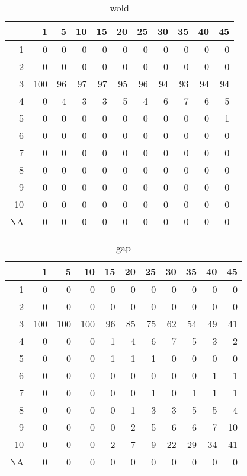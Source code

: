 \documentclass[11pt]{article}
\begin{document}
\begin{table}[H]
\centering
\begin{tabular}{rrrrrrrrrrr}
  \hline
 & 1 & 5 & 10 & 15 & 20 & 25 & 30 & 35 & 40 & 45 \\ 
  \hline
1 & 0 & 0 & 0 & 0 & 0 & 0 & 0 & 0 & 0 & 0 \\ 
  2 & 0 & 0 & 0 & 0 & 0 & 0 & 0 & 0 & 0 & 0 \\ 
  3 & 100 & 96 & 97 & 97 & 95 & 96 & 94 & 93 & 94 & 94 \\ 
  4 & 0 & 4 & 3 & 3 & 5 & 4 & 6 & 7 & 6 & 5 \\ 
  5 & 0 & 0 & 0 & 0 & 0 & 0 & 0 & 0 & 0 & 1 \\ 
  6 & 0 & 0 & 0 & 0 & 0 & 0 & 0 & 0 & 0 & 0 \\ 
  7 & 0 & 0 & 0 & 0 & 0 & 0 & 0 & 0 & 0 & 0 \\ 
  8 & 0 & 0 & 0 & 0 & 0 & 0 & 0 & 0 & 0 & 0 \\ 
  9 & 0 & 0 & 0 & 0 & 0 & 0 & 0 & 0 & 0 & 0 \\ 
  10 & 0 & 0 & 0 & 0 & 0 & 0 & 0 & 0 & 0 & 0 \\ 
  NA & 0 & 0 & 0 & 0 & 0 & 0 & 0 & 0 & 0 & 0 \\ 
   \hline
\end{tabular}
\caption{wold} 
\end{table}
\begin{table}[H]
\centering
\begin{tabular}{rrrrrrrrrrr}
  \hline
 & 1 & 5 & 10 & 15 & 20 & 25 & 30 & 35 & 40 & 45 \\ 
  \hline
1 & 0 & 0 & 0 & 0 & 0 & 0 & 0 & 0 & 0 & 0 \\ 
  2 & 0 & 0 & 0 & 0 & 0 & 0 & 0 & 0 & 0 & 0 \\ 
  3 & 100 & 100 & 100 & 96 & 85 & 75 & 62 & 54 & 49 & 41 \\ 
  4 & 0 & 0 & 0 & 1 & 4 & 6 & 7 & 5 & 3 & 2 \\ 
  5 & 0 & 0 & 0 & 1 & 1 & 1 & 0 & 0 & 0 & 0 \\ 
  6 & 0 & 0 & 0 & 0 & 0 & 0 & 0 & 0 & 1 & 1 \\ 
  7 & 0 & 0 & 0 & 0 & 0 & 1 & 0 & 1 & 1 & 1 \\ 
  8 & 0 & 0 & 0 & 0 & 1 & 3 & 3 & 5 & 5 & 4 \\ 
  9 & 0 & 0 & 0 & 0 & 2 & 5 & 6 & 6 & 7 & 10 \\ 
  10 & 0 & 0 & 0 & 2 & 7 & 9 & 22 & 29 & 34 & 41 \\ 
  NA & 0 & 0 & 0 & 0 & 0 & 0 & 0 & 0 & 0 & 0 \\ 
   \hline
\end{tabular}
\caption{gap} 
\end{table}
\end{document}
